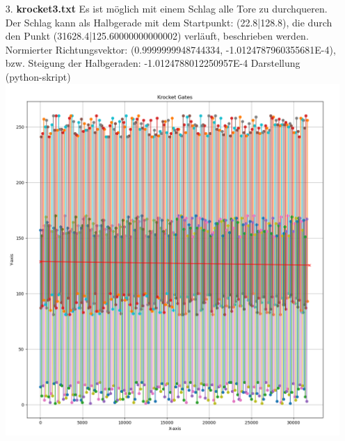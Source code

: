 \documentclass[a4paper,10pt,ngerman]{scrartcl}
\begin{document}
\begin{itemize}
  \item [3.] \textbf{krocket3.txt}
  \newline
  Es ist möglich mit einem Schlag alle Tore zu durchqueren.
  \newline
  Der Schlag kann als Halbgerade mit dem Startpunkt: (22.8|128.8), die durch den \newline Punkt (31628.4|125.60000000000002) verläuft, beschrieben werden.
  \newline
  Normierter Richtungsvektor: (0.9999999948744334, -1.0124787960355681E-4), bzw. Steigung der Halbgeraden: -1.0124788012250957E-4
  \newline
  \newline
  Darstellung (python-skript)
  \newline
  \includegraphics[scale=0.40]{krocket3.png}
  \newpage


\end{itemize}
\end{document}
